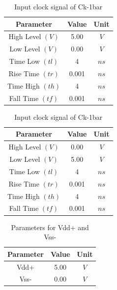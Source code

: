 \documentclass[a4paper,12pt]{article}
\begin{document}
\begin{table}[H]
		
		\begin{subtable}[t]{0.48\textwidth} %
			\centering
			\begin{tabular}{|c|c|c|}
				\hline
				\textbf{Parameter}          & \textbf{Value} & \textbf{Unit} \\ \hline
				High Level $(V)$            & 5.00           & $V$           \\ \hline
				Low Level $(V)$             & 0.00           & $V$           \\ \hline
				Time Low $(tl)$             & 4        & $ns$          \\ \hline
				Rise Time $(tr)$            & 0.001          & $ns$          \\ \hline
				Time High $(th)$            & 4          & $ns$          \\ \hline
				Fall Time $(tf)$            & 0.001          & $ns$          \\ \hline
			\end{tabular}
			
			\caption{Input clock signal of Ck-1} %
		\end{subtable}
		\hfil
		\begin{subtable}[t]{0.48\textwidth} %
			\centering
			\begin{tabular}{|c|c|c|}
				\hline
				\textbf{Parameter}          & \textbf{Value} & \textbf{Unit} \\ \hline
				High Level $(V)$            & 0.00           & $V$           \\ \hline
				Low Level $(V)$             & 5.00           & $V$           \\ \hline
				Time Low $(tl)$             & 4          & $ns$          \\ \hline
				Rise Time $(tr)$            & 0.001          & $ns$          \\ \hline
				Time High $(th)$            & 4         & $ns$          \\ \hline
				Fall Time $(tf)$            & 0.001          & $ns$          \\ \hline
			\end{tabular}
			
			\caption{Input clock signal of Ck-1bar} %
		\end{subtable}
	\end{table}
	
	\begin{table}[H]
		\centering
		\caption{Parameters for Vdd+ and Vss- }
		\begin{tabular}{|c|c|c|}
			\hline
			\textbf{Parameter} & \textbf{Value} & \textbf{Unit} \\ \hline
			Vdd+               & 5.00           & $V $            \\ \hline
			Vss-               & 0.00           & $V$             \\ \hline
		\end{tabular}
		
	\end{table}
\end{document}
